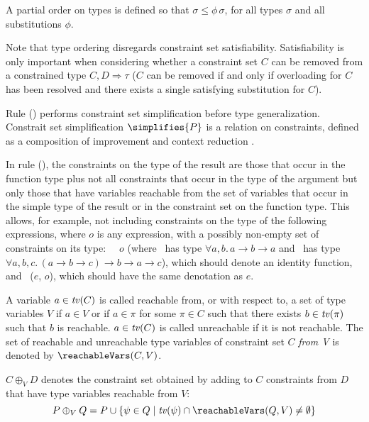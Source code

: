 A partial order on types is defined so that $\sigma \leq
\phi\,\sigma$, for all types $\sigma$ and all substitutions $\phi$.

Note that type ordering disregards constraint set satisfiability.
Satisfiability is only important when considering whether a constraint
set $C$ can be removed from a constrained type $C,D \Rightarrow \tau$
($C$ can be removed if and only if overloading for $C$ has been
resolved and there exists a single satisfying substitution for
$C$)\cite{JBCS-Ambiguity-and-constrained-polymorphism}.

Rule (\LET) performs constraint set simplification before type
generalization. Constrait set simplification $\simplifies{P}$ is a
relation on cons\-traints, defined as a composition of improvement and
context reduction \cite{JBCS-Ambiguity-and-constrained-polymorphism}.

In rule (\APP), the constraints on the type of the result are those
that occur in the function type plus not all constraints that occur in
the type of the argument but only those that have variables reachable
from the set of variables that occur in the simple type of the result
or in the constraint set on the function type.  This allows, for
example, not including constraints on the type of the following
expressions, where $o$ is any expression, with a possibly non-empty
set of constraints on its type: {\tt \flip\ \const\ $o$} (where
\const\ has type $\forall a, b.\,a \rightarrow b \rightarrow a$ and
\flip\ has type $\forall a, b, c.\,(a \rightarrow b \rightarrow c)
\rightarrow b \rightarrow a\rightarrow c$), which should denote an
identity function, and \fst\ ($e$, $o$), which should have the same
denotation as $e$.

A variable $a\in \text{\it tv\/}(C)$ is called reachable from, or with respect to,
a set of type variables $V$ if $a\in V$ or if $a\in \pi$ for some
$\pi\in C$ such that there exists $b\in \text{\it tv\/}(\pi)$ such that $b$ is
reachable. $a\in \text{\it tv\/}(C)$ is called unreachable if it is not
reachable. The set of reachable and unreachable type variables of
constraint set $C$ {\em from V\/} is denoted by $\reachableVars(C,V)$.


$C \oplus_V D$ denotes the constraint set obtained by adding to $C$
constraints from $D$ that have type variables reachable from $V$:
  \[ P \oplus_V Q = P \cup \{ \psi \in Q \mid \tv(\psi) \cap \reachableVars(Q,V) \not= \emptyset \} \]


